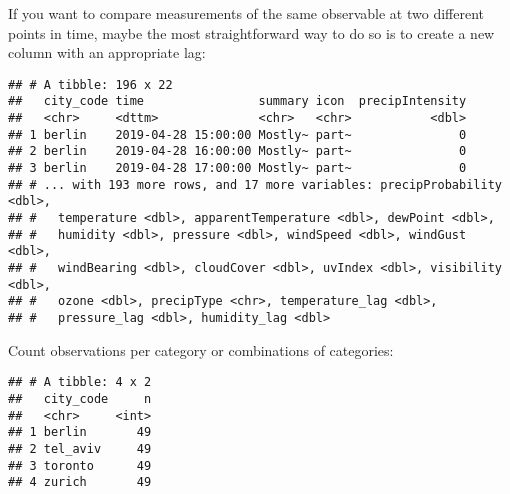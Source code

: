 \documentclass[]{book}
\newenvironment{Shaded}{\begin{snugshade}}{\end{snugshade}}
\newcommand{\DataTypeTok}[1]{\textcolor[rgb]{0.13,0.29,0.53}{#1}}
\newcommand{\KeywordTok}[1]{\textcolor[rgb]{0.13,0.29,0.53}{\textbf{#1}}}
\newcommand{\NormalTok}[1]{#1}
\newcommand{\OperatorTok}[1]{\textcolor[rgb]{0.81,0.36,0.00}{\textbf{#1}}}
\newcommand{\StringTok}[1]{\textcolor[rgb]{0.31,0.60,0.02}{#1}}
\begin{document}
If you want to compare measurements of the same observable at two different points in time, maybe the most straightforward way to do so is to create a new column with an appropriate lag:

\begin{Shaded}
\end{Shaded}

\begin{verbatim}
## # A tibble: 196 x 22
##   city_code time                summary icon  precipIntensity
##   <chr>     <dttm>              <chr>   <chr>           <dbl>
## 1 berlin    2019-04-28 15:00:00 Mostly~ part~               0
## 2 berlin    2019-04-28 16:00:00 Mostly~ part~               0
## 3 berlin    2019-04-28 17:00:00 Mostly~ part~               0
## # ... with 193 more rows, and 17 more variables: precipProbability <dbl>,
## #   temperature <dbl>, apparentTemperature <dbl>, dewPoint <dbl>,
## #   humidity <dbl>, pressure <dbl>, windSpeed <dbl>, windGust <dbl>,
## #   windBearing <dbl>, cloudCover <dbl>, uvIndex <dbl>, visibility <dbl>,
## #   ozone <dbl>, precipType <chr>, temperature_lag <dbl>,
## #   pressure_lag <dbl>, humidity_lag <dbl>
\end{verbatim}

Count observations per category or combinations of categories:

\begin{Shaded}
\end{Shaded}

\begin{verbatim}
## # A tibble: 4 x 2
##   city_code     n
##   <chr>     <int>
## 1 berlin       49
## 2 tel_aviv     49
## 3 toronto      49
## 4 zurich       49
\end{verbatim}

\begin{Shaded}
\end{Shaded}
\end{document}
